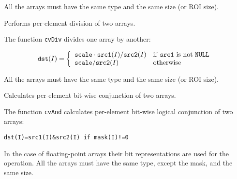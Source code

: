 All the arrays must have the same type and the same size (or ROI size).

\label{Div}

Performs per-element division of two arrays.


\begin{description}
\end{description}

The function \texttt{cvDiv} divides one array by another:

\[
\texttt{dst}(I)=\left\{ \begin{array}{l l} \texttt{scale} \cdot \texttt{src1}(I)/\texttt{src2}(I) & \mbox{if \texttt{src1} is not \texttt{NULL}}\\ \texttt{scale}/\texttt{src2}(I) & \mbox{otherwise}\\ \end{array} \right.
\]

All the arrays must have the same type and the same size (or ROI size).


\label{And}

Calculates per-element bit-wise conjunction of two arrays.


\begin{description}
\end{description}


The function \texttt{cvAnd} calculates per-element bit-wise logical conjunction of two arrays:

\begin{lstlisting}
dst(I)=src1(I)&src2(I) if mask(I)!=0
\end{lstlisting}

In the case of floating-point arrays their bit representations are used for the operation. All the arrays must have the same type, except the mask, and the same size.

